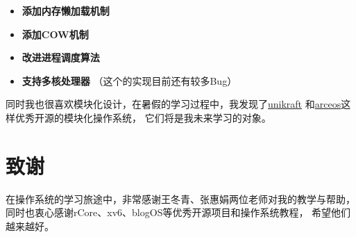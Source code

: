 \begin{itemize}
    \item \textbf{添加内存懒加载机制}
    \item \textbf{添加COW机制}
    \item \textbf{改进进程调度算法}
    \item \textbf{支持多核处理器} （这个的实现目前还有较多Bug）
\end{itemize}

同时我也很喜欢模块化设计，在暑假的学习过程中，我发现了\href{https://github.com/unikraft/unikraft}{unikraft}
和\href{https://github.com/arceos-org/arceos}{arceos}这样优秀开源的模块化操作系统，
它们将是我未来学习的对象。

\section*{致谢}

在操作系统的学习旅途中，非常感谢王冬青、张惠娟两位老师对我的教学与帮助，同时也衷心感谢rCore、xv6、blogOS等优秀开源项目和操作系统教程，
希望他们越来越好。